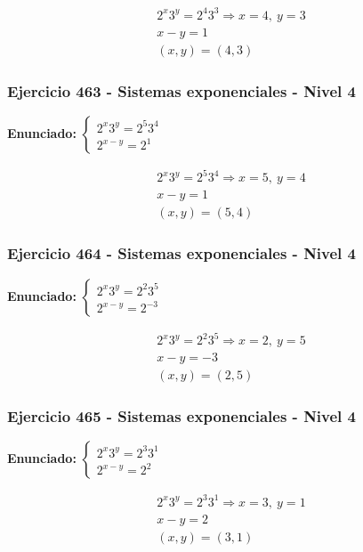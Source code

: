 \documentclass[12pt,a4paper]{article}
\begin{document}
\[
\begin{aligned}
2^x3^y=2^{4}3^{3}\Rightarrow x=4,\ y=3\\
x-y=1\\
\boxed{(x,y)=(4,3)}
\end{aligned}
\]


\subsubsection*{Ejercicio 463 - Sistemas exponenciales - Nivel 4}
\textbf{Enunciado:} \(\begin{cases} 2^x3^y=2^{5}3^{4}\\ 2^{x-y}=2^{1}\end{cases}\)

\[
\begin{aligned}
2^x3^y=2^{5}3^{4}\Rightarrow x=5,\ y=4\\
x-y=1\\
\boxed{(x,y)=(5,4)}
\end{aligned}
\]


\subsubsection*{Ejercicio 464 - Sistemas exponenciales - Nivel 4}
\textbf{Enunciado:} \(\begin{cases} 2^x3^y=2^{2}3^{5}\\ 2^{x-y}=2^{-3}\end{cases}\)

\[
\begin{aligned}
2^x3^y=2^{2}3^{5}\Rightarrow x=2,\ y=5\\
x-y=-3\\
\boxed{(x,y)=(2,5)}
\end{aligned}
\]


\subsubsection*{Ejercicio 465 - Sistemas exponenciales - Nivel 4}
\textbf{Enunciado:} \(\begin{cases} 2^x3^y=2^{3}3^{1}\\ 2^{x-y}=2^{2}\end{cases}\)

\[
\begin{aligned}
2^x3^y=2^{3}3^{1}\Rightarrow x=3,\ y=1\\
x-y=2\\
\boxed{(x,y)=(3,1)}
\end{aligned}
\]
\end{document}

